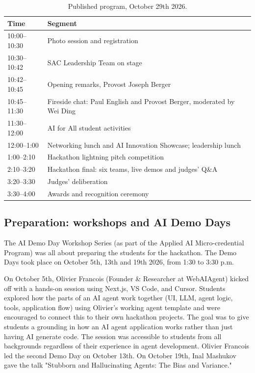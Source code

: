 \documentclass[sigconf,nonacm]{acmart}
\begin{document}
\begin{table}[t]
  \caption{Published program, October 29th 2026.}
  \label{tab:program}
  \small
  \begin{tabularx}{\columnwidth}{@{}lX@{}}
    \toprule
    \textbf{Time} & \textbf{Segment} \\
    \midrule
    10:00--10:30 & Photo session and registration \\
    10:30--10:42 & SAC Leadership Team on stage \\
    10:42--10:45 & Opening remarks, Provost Joseph Berger \\
    10:45--11:30 & Fireside chat: Paul English and Provost Berger, moderated by Wei Ding \\
    11:30--12:00 & AI for All student activities \\
    12:00--1:00  & Networking lunch and AI Innovation Showcase; leadership lunch \\
    1:00--2:10   & Hackathon lightning pitch competition \\
    2:10--3:20   & Hackathon final: six teams, live demos and judges' Q\&A \\
    3:20--3:30   & Judges' deliberation \\
    3:30--4:00   & Awards and recognition ceremony \\
    \bottomrule
  \end{tabularx}
\end{table}

\subsection{Preparation: workshops and AI Demo Days}
\label{sec:workshops}
The AI Demo Day Workshop Series (as part of the Applied AI Micro-credential Program) was all about preparing the students for the hackathon. The Demo Days took place on October 5th, 13th and 19th 2026, from 1:30 to 3:30 p.m.

On October 5th, Olivier Francois (Founder \& Researcher at WebAIAgent) kicked off with a hands-on session using Next.js, VS Code, and Cursor. Students explored how the parts of an AI agent work together (UI, LLM, agent logic, tools, application flow) using Olivier's working agent template and were encouraged to connect this to their own hackathon projects. The goal was to give students a grounding in how an AI agent application works rather than just having AI generate code. The session was accessible to students from all backgrounds regardless of their experience in agent development. Olivier Francois led the second Demo Day on October 13th. On October 19th, Inal Mashukov gave the talk "Stubborn and Hallucinating Agents: The Bias and Variance."
\end{document}
